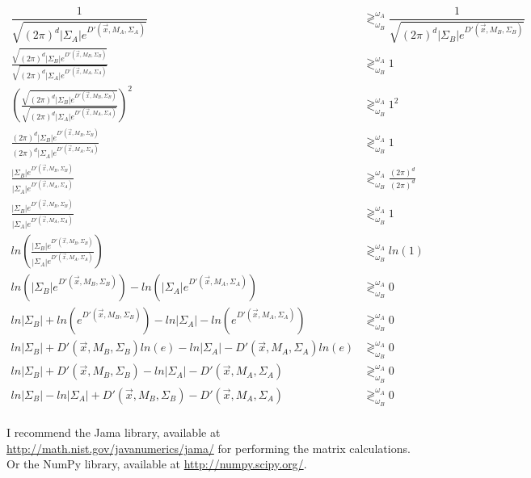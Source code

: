 \documentclass{article}
\begin{document}
\begin{align*}
  \dfrac{1}{\sqrt{(2\pi)^d |\Sigma_A| e^{D'(\vec{x},M_A,\Sigma_A)}}} 
  &\gtrless^{\omega_A}_{\omega_B}
  \dfrac{1}{\sqrt{(2\pi)^d |\Sigma_B| e^{D'(\vec{x},M_B,\Sigma_B)}}} \\
  \frac{\sqrt{(2\pi)^d |\Sigma_B|
      e^{D'(\vec{x},M_B,\Sigma_B)}}}{\sqrt{(2\pi)^d |\Sigma_A|
      e^{D'(\vec{x},M_A,\Sigma_A)}}}
  &\gtrless^{\omega_A}_{\omega_B}
  1 \\
  \left(
  \frac{\sqrt{(2\pi)^d |\Sigma_B|
      e^{D'(\vec{x},M_B,\Sigma_B)}}}{\sqrt{(2\pi)^d |\Sigma_A|
      e^{D'(\vec{x},M_A,\Sigma_A)}}}
  \right)^2
  &\gtrless^{\omega_A}_{\omega_B}
  1^2 \\
  \frac{(2\pi)^d |\Sigma_B|
      e^{D'(\vec{x},M_B,\Sigma_B)}}{(2\pi)^d |\Sigma_A|
      e^{D'(\vec{x},M_A,\Sigma_A)}}
  &\gtrless^{\omega_A}_{\omega_B}
  1 \\
  \frac{|\Sigma_B|
      e^{D'(\vec{x},M_B,\Sigma_B)}}{|\Sigma_A|
      e^{D'(\vec{x},M_A,\Sigma_A)}}
  &\gtrless^{\omega_A}_{\omega_B}
  \frac{(2\pi)^d}{(2\pi)^d} \\
  \frac{|\Sigma_B|
      e^{D'(\vec{x},M_B,\Sigma_B)}}{|\Sigma_A|
      e^{D'(\vec{x},M_A,\Sigma_A)}}
  &\gtrless^{\omega_A}_{\omega_B}
  1 \\
  ln \left(
  \frac{|\Sigma_B|
      e^{D'(\vec{x},M_B,\Sigma_B)}}{|\Sigma_A|
      e^{D'(\vec{x},M_A,\Sigma_A)}}
  \right)
  &\gtrless^{\omega_A}_{\omega_B}
  ln(1) \\
  ln(|\Sigma_B|e^{D'(\vec{x},M_B,\Sigma_B)}) -
  ln(|\Sigma_A|e^{D'(\vec{x},M_A,\Sigma_A)})
  &\gtrless^{\omega_A}_{\omega_B}
  0 \\
  ln|\Sigma_B| + ln(e^{D'(\vec{x},M_B,\Sigma_B)}) -
  ln|\Sigma_A| - ln(e^{D'(\vec{x},M_A,\Sigma_A)})
  &\gtrless^{\omega_A}_{\omega_B}
  0 \\
  ln|\Sigma_B| + D'(\vec{x},M_B,\Sigma_B)ln(e) -
  ln|\Sigma_A| - D'(\vec{x},M_A,\Sigma_A)ln(e)
  &\gtrless^{\omega_A}_{\omega_B}
  0 \\
  ln|\Sigma_B| + D'(\vec{x},M_B,\Sigma_B) -
  ln|\Sigma_A| - D'(\vec{x},M_A,\Sigma_A)
  &\gtrless^{\omega_A}_{\omega_B}
  0 \\
  ln|\Sigma_B| - ln|\Sigma_A| +
  D'(\vec{x},M_B,\Sigma_B) - D'(\vec{x},M_A,\Sigma_A)
  &\gtrless^{\omega_A}_{\omega_B}
  0 \\
\end{align*}

I recommend the Jama library, available at
\href{http://math.nist.gov/javanumerics/jama/}{http://math.nist.gov/javanumerics/jama/}
for performing the matrix calculations.  Or the NumPy library,
available at \href{http://numpy.scipy.org/}{http://numpy.scipy.org/}.
\end{document}
